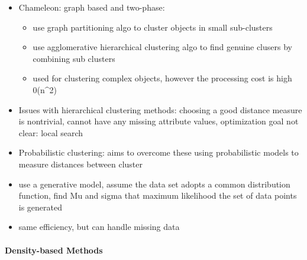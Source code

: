 \documentclass[11pt]{article}
\providecommand{\tightlist}{%
      \setlength{\itemsep}{0pt}\setlength{\parskip}{0pt}}
\begin{document}
    \begin{itemize}
\tightlist
\item
  Chameleon: graph based and two-phase:

  \begin{itemize}
  \tightlist
  \item
    use graph partitioning algo to cluster objects in small sub-clusters
  \item
    use agglomerative hierarchical clustering algo to find genuine
    clusers by combining sub clusters
  \item
    used for clustering complex objects, however the processing cost is
    high 0(n\^{}2)
  \end{itemize}
\end{itemize}

    \begin{itemize}
\tightlist
\item
  Issues with hierarchical clustering methods: choosing a good distance
  measure is nontrivial, cannot have any missing attribute values,
  optimization goal not clear: local search
\item
  Probabilistic clustering: aims to overcome these using probabilistic
  models to measure distances between cluster
\item
  use a generative model, assume the data set adopts a common
  distribution function, find Mu and sigma that maximum likelihood the
  set of data points is generated
\item
  same efficiency, but can handle missing data
\end{itemize}

    \paragraph{Density-based Methods}\label{density-based-methods}
\end{document}
